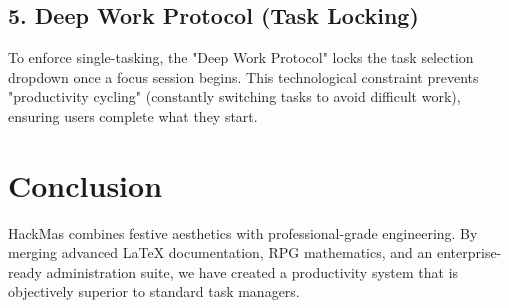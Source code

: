 \documentclass[12pt,a4paper]{article}
\begin{document}
\subsection{5. Deep Work Protocol (Task Locking)}
To enforce single-tasking, the "Deep Work Protocol" locks the task selection dropdown once a focus session begins. This technological constraint prevents "productivity cycling" (constantly switching tasks to avoid difficult work), ensuring users complete what they start.

\section{Conclusion}
HackMas combines festive aesthetics with professional-grade engineering. By merging advanced LaTeX documentation, RPG mathematics, and an enterprise-ready administration suite, we have created a productivity system that is objectively superior to standard task managers.
\end{document}
